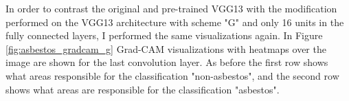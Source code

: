 \begin{figure}[H]
{}
\label{fig:vgg13_filter_activation}
\end{figure}

In order to contrast the original and pre-trained VGG13 with the modification performed on the VGG13 architecture with scheme "G" and only 16 units in the fully connected layers, I performed the same visualizations again. In Figure \ref{fig:asbestos_gradcam_g} Grad-CAM visualizations with heatmaps over the image are shown for the last convolution layer. As before the first row shows what areas responsible for the classification "non-asbestos", and the second row shows what areas are responsible for the classification "asbestos".

